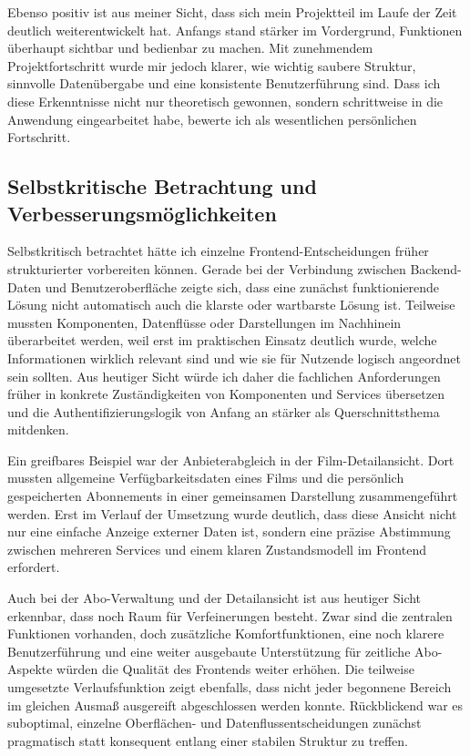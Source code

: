 Ebenso positiv ist aus meiner Sicht, dass sich mein Projektteil im Laufe der Zeit deutlich weiterentwickelt hat. Anfangs stand stärker im Vordergrund, Funktionen überhaupt sichtbar und bedienbar zu machen. Mit zunehmendem Projektfortschritt wurde mir jedoch klarer, wie wichtig saubere Struktur, sinnvolle Datenübergabe und eine konsistente Benutzerführung sind. Dass ich diese Erkenntnisse nicht nur theoretisch gewonnen, sondern schrittweise in die Anwendung eingearbeitet habe, bewerte ich als wesentlichen persönlichen Fortschritt.

\subsection{Selbstkritische Betrachtung und Verbesserungsmöglichkeiten}
Selbstkritisch betrachtet hätte ich einzelne Frontend-Entscheidungen früher strukturierter vorbereiten können. Gerade bei der Verbindung zwischen Backend-Daten und Benutzeroberfläche zeigte sich, dass eine zunächst funktionierende Lösung nicht automatisch auch die klarste oder wartbarste Lösung ist. Teilweise mussten Komponenten, Datenflüsse oder Darstellungen im Nachhinein überarbeitet werden, weil erst im praktischen Einsatz deutlich wurde, welche Informationen wirklich relevant sind und wie sie für Nutzende logisch angeordnet sein sollten. Aus heutiger Sicht würde ich daher die fachlichen Anforderungen früher in konkrete Zuständigkeiten von Komponenten und Services übersetzen und die Authentifizierungslogik von Anfang an stärker als Querschnittsthema mitdenken.

Ein greifbares Beispiel war der Anbieterabgleich in der Film-Detailansicht. Dort mussten allgemeine Verfügbarkeitsdaten eines Films und die persönlich gespeicherten Abonnements in einer gemeinsamen Darstellung zusammengeführt werden. Erst im Verlauf der Umsetzung wurde deutlich, dass diese Ansicht nicht nur eine einfache Anzeige externer Daten ist, sondern eine präzise Abstimmung zwischen mehreren Services und einem klaren Zustandsmodell im Frontend erfordert.

Auch bei der Abo-Verwaltung und der Detailansicht ist aus heutiger Sicht erkennbar, dass noch Raum für Verfeinerungen besteht. Zwar sind die zentralen Funktionen vorhanden, doch zusätzliche Komfortfunktionen, eine noch klarere Benutzerführung und eine weiter ausgebaute Unterstützung für zeitliche Abo-Aspekte würden die Qualität des Frontends weiter erhöhen. Die teilweise umgesetzte Verlaufsfunktion zeigt ebenfalls, dass nicht jeder begonnene Bereich im gleichen Ausmaß ausgereift abgeschlossen werden konnte. Rückblickend war es suboptimal, einzelne Oberflächen- und Datenflussentscheidungen zunächst pragmatisch statt konsequent entlang einer stabilen Struktur zu treffen.

